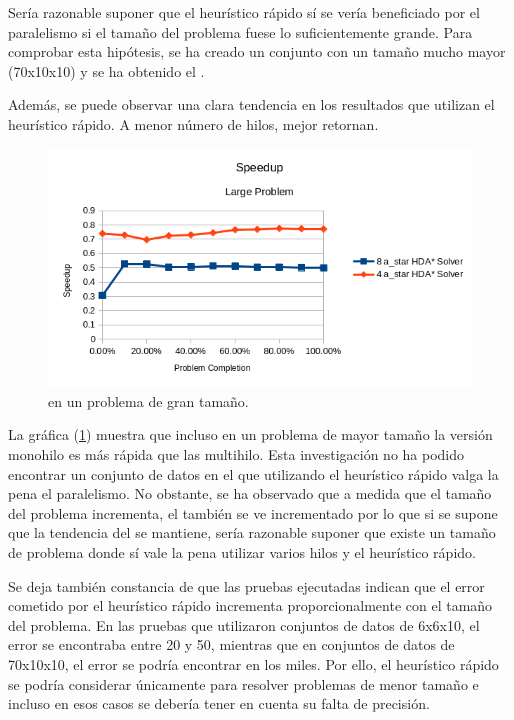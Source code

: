 Sería razonable suponer que el heurístico rápido
sí se vería beneficiado por el paralelismo si el tamaño del
problema fuese lo suficientemente grande.
Para comprobar esta hipótesis, se ha creado un conjunto
con un tamaño mucho mayor (70x10x10) y se ha obtenido el .

Además, se puede observar una clara tendencia en los resultados que utilizan
el heurístico rápido. A menor número de hilos, mejor  retornan.

\begin{figure}[h]
    \centering
    \includegraphics[width=\textwidth]{Media/Ch2/Speedup_Large_Problem.png}
    \caption{ en un problema de gran tamaño.}
    \label{fig:Speedup_Large_Problem}
\end{figure}

La gráfica (\ref{fig:Speedup_Large_Problem}) muestra que incluso en un problema de mayor tamaño
la versión monohilo es más rápida que las multihilo.
Esta investigación no ha podido encontrar un conjunto de datos
en el que utilizando el heurístico rápido valga la pena el paralelismo.
No obstante, se ha observado que a medida que el tamaño
del problema incrementa, el  también se ve incrementado
por lo que si se supone que la tendencia del 
se mantiene, sería razonable suponer que existe un tamaño de
problema donde sí vale la pena utilizar varios hilos y 
el heurístico rápido.

Se deja también constancia de que las pruebas ejecutadas indican que
el error cometido por el heurístico rápido incrementa proporcionalmente
con el tamaño del problema.
En las pruebas que utilizaron conjuntos de datos de 6x6x10,
el error se encontraba entre 20 y 50, mientras que en
conjuntos de datos de 70x10x10, el error se podría encontrar
en los miles.
Por ello, el heurístico rápido se podría considerar únicamente para
resolver problemas de menor tamaño e incluso en esos casos
se debería tener en cuenta su falta de precisión.

